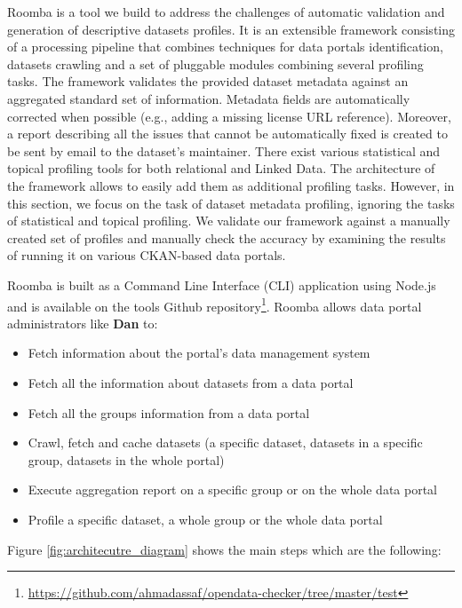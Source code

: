 \documentclass[a4paper,11pt,twoside]{ThesisStyle}
\begin{document}
Roomba is a tool we build to address the challenges of automatic validation and generation of descriptive datasets profiles. It is an extensible framework consisting of a processing pipeline that combines techniques for data portals identification, datasets crawling and a set of pluggable modules combining several profiling tasks. The framework validates the provided dataset metadata against an aggregated standard set of information. Metadata fields are automatically corrected when possible (e.g., adding a missing license URL reference). Moreover, a report describing all the issues that cannot be automatically fixed is created to be sent by email to the dataset's maintainer. There exist various statistical and topical profiling tools for both relational and Linked Data. The architecture of the framework allows to easily add them as additional profiling tasks. However, in this section, we focus on the task of dataset metadata profiling, ignoring the tasks of statistical and topical profiling. We validate our framework against a manually created set of profiles and manually check the accuracy by examining the results of running it on various CKAN-based data portals.

Roomba is built as a Command Line Interface (CLI) application using Node.js and is available on the tools Github repository\footnote{\url{https://github.com/ahmadassaf/opendata-checker/tree/master/test}}. Roomba allows data portal administrators like \textbf{Dan} to:

\begin{itemize}
  \item Fetch information about the portal's data management system
	\item Fetch all the information about datasets from a data portal
	\item Fetch all the groups information from a data portal
	\item Crawl, fetch and cache datasets (a specific dataset, datasets in a specific group, 	datasets in the whole portal)
	\item Execute aggregation report on a specific group or on the whole data portal
	\item Profile a specific dataset, a whole group or the whole data portal
\end{itemize}

Figure \ref{fig:architecutre_diagram} shows the main steps which are the following:
\end{document}
